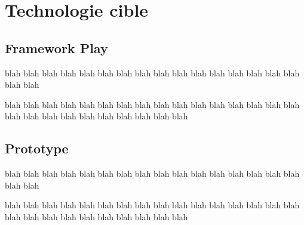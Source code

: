 \chapter{Technologie cible}\label{chap:Intro}
\section{Framework Play}
blah blah blah blah blah blah blah blah blah blah blah blah blah blah blah blah blah blah 

blah blah blah blah blah blah blah blah blah blah blah blah blah blah blah blah blah blah blah blah blah blah blah blah blah blah 
\section{Prototype}
blah blah blah blah blah blah blah blah blah blah blah blah blah blah blah blah blah blah 

blah blah blah blah blah blah blah blah blah blah blah blah blah blah blah blah blah blah blah blah blah blah blah blah blah blah 

